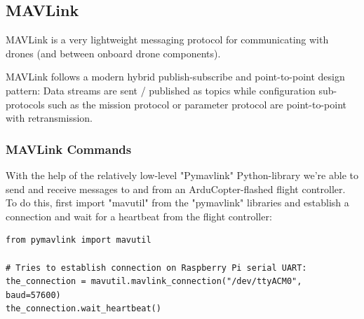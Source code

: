 \subsection{MAVLink}
\label{MAVLink}

MAVLink is a very lightweight messaging protocol for communicating with drones (and between onboard drone components).

MAVLink follows a modern hybrid publish-subscribe and point-to-point design pattern: Data streams are sent / published as topics while configuration sub-protocols such as the mission protocol or parameter protocol are point-to-point with retransmission. \cite{documentation-MAVLink}

\subsubsection{MAVLink Commands}
\label{MAVLink-commands}
With the help of the relatively low-level "Pymavlink" Python-library we're able to send and receive messages to and from an ArduCopter-flashed flight controller. To do this, first import "mavutil" from the "pymavlink" libraries and establish a connection and wait for a heartbeat from the flight controller:
\begin{lstlisting}[language=PythonPlus]
from pymavlink import mavutil

# Tries to establish connection on Raspberry Pi serial UART:
the_connection = mavutil.mavlink_connection("/dev/ttyACM0", baud=57600)
the_connection.wait_heartbeat()
\end{lstlisting}

